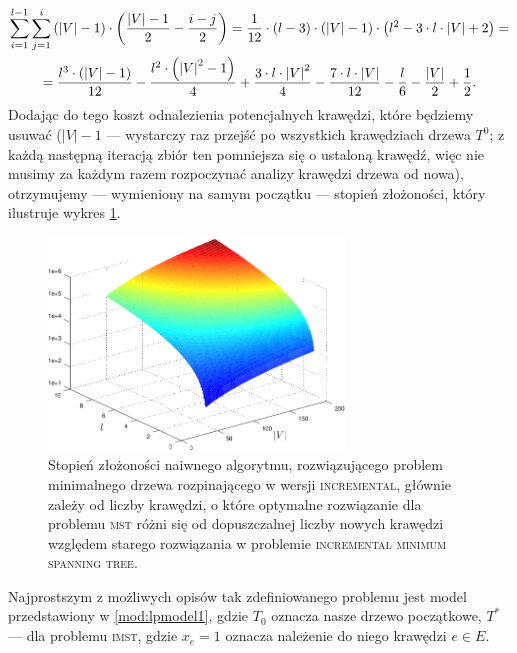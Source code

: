 \begin{gather*}
	\sum_{\mathclap{i=1}}^{\mathclap{l-1}} \sum_{\mathclap{j=1}}^{\mathclap{i}} \left( \left| V \right| - 1 \right) \cdot \left( \frac{\left| V \right| - 1}{2} - \frac{i - j}{2} \right) = \frac{1}{12} \cdot \left( l - 3 \right) \cdot \left( \left| V \right| - 1 \right) \cdot \left( l^{2} - 3 \cdot l \cdot \left| V \right| + 2 \right) = \\ = \frac{l^{3} \cdot \left( \left| V \right| - 1 \right)}{12} - \frac{l^{2} \cdot \left( \left| V \right|^{2} - 1 \right)}{4} + \frac{3 \cdot l \cdot \left| V \right|^{2}}{4} - \frac{7 \cdot l \cdot \left| V \right|}{12} - \frac{l}{6} - \frac{\left| V \right|}{2} + \frac{1}{2}\text{.}
\end{gather*}
Dodając do tego koszt odnalezienia potencjalnych krawędzi, które będziemy usuwać ($\left| V \right| - 1$ --- wystarczy raz przejść po wszystkich krawędziach drzewa $T^{0}$; z każdą następną iteracją zbiór ten pomniejsza się o ustaloną krawędź, więc nie musimy za każdym razem rozpoczynać analizy krawędzi drzewa od nowa), otrzymujemy --- wymieniony na samym początku --- stopień złożoności, który ilustruje wykres \ref{fig:incmst3D}.

\begin{figure}[!htbp]
	\null\hfill
	\includegraphics[width=0.7\textwidth]{Chapter_II/INC-MST-Other/incmst3DPlot_psfrag}
	\hfill\null
	\caption{
		Stopień złożoności naiwnego algorytmu, rozwiązującego problem minimalnego drzewa rozpinającego w wersji \textsc{incremental}, głównie zależy od liczby krawędzi, o które optymalne rozwiązanie dla problemu \textsc{mst} różni się od dopuszczalnej liczby nowych krawędzi względem starego rozwiązania w problemie \textsc{incremental minimum spanning tree}.
	}
	\label{fig:incmst3D}
\end{figure}

Najprostszym z możliwych opisów tak zdefiniowanego problemu jest model przedstawiony w \ref{mod:lpmodel1}, gdzie $T_{0}$ oznacza nasze drzewo początkowe, $T^{\ast}$ --- dla problemu \textsc{imst}, gdzie $x_{e} = 1$ oznacza należenie do niego krawędzi $e \in E$.

